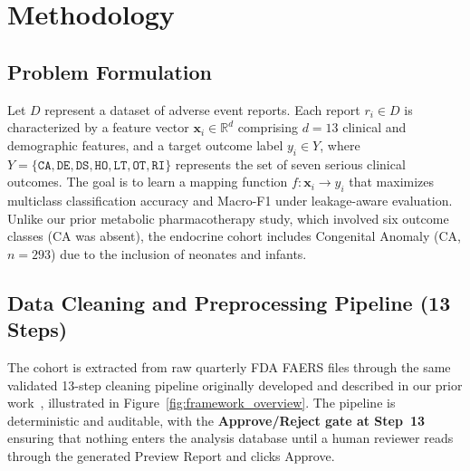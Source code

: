 \documentclass[10pt,twocolumn]{article}
\newcommand{\FAERS}{\textsf{FAERS}\xspace}
\begin{document}
\section{Methodology}
 
\subsection{Problem Formulation}
Let $D$ represent a dataset of adverse event reports. Each report $r_i \in D$ is characterized by a feature vector $\mathbf{x}_i \in \mathbb{R}^d$ comprising $d=13$ clinical and demographic features, and a target outcome label $y_i \in Y$, where $Y = \{\texttt{CA}, \texttt{DE}, \texttt{DS}, \texttt{HO}, \texttt{LT}, \texttt{OT}, \texttt{RI}\}$ represents the set of seven serious clinical outcomes. The goal is to learn a mapping function $f: \mathbf{x}_i \to y_i$ that maximizes multiclass classification accuracy and Macro-F1 under leakage-aware evaluation. Unlike our prior metabolic pharmacotherapy study, which involved six outcome classes (CA was absent), the endocrine cohort includes Congenital Anomaly (CA, $n = 293$) due to the inclusion of neonates and infants.
 
\subsection{Data Cleaning and Preprocessing Pipeline (13 Steps)}
\label{sec:pipeline}
 
The cohort is extracted from raw quarterly FDA \FAERS files through the same validated 13-step cleaning pipeline originally developed and described in our prior work~\cite{telkar2026obesity}, illustrated in Figure~\ref{fig:framework_overview}. The pipeline is deterministic and auditable, with the \textbf{Approve/Reject gate at Step~13} ensuring that nothing enters the analysis database until a human reviewer reads through the generated Preview Report and clicks Approve.
 
\end{document}
